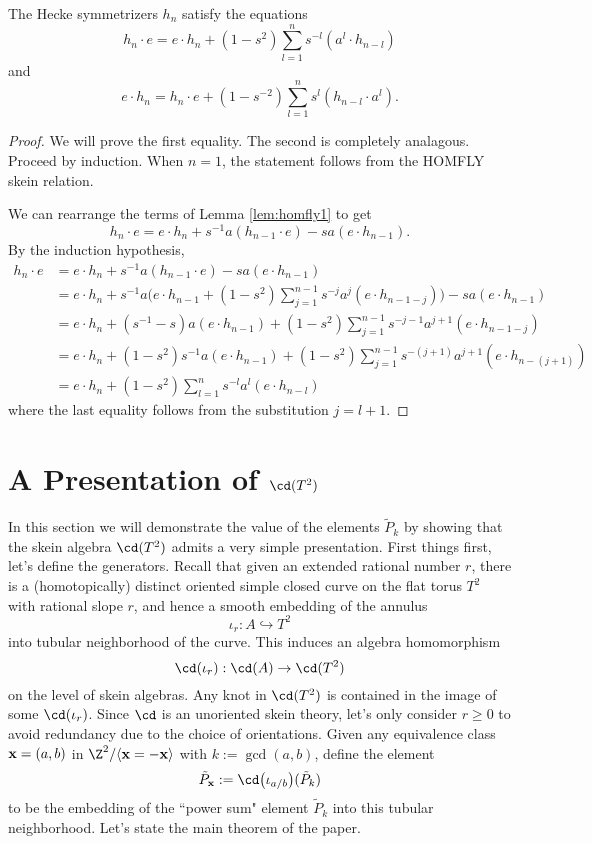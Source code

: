 \begin{theorem} \label{prop:homfly2}
The Hecke symmetrizers $h_n$ satisfy the equations
\[
h_n \cdot e = e \cdot h_n + ( 1 - s^2 ) \sum_{l=1}^{n} s^{-l} ( a^l \cdot h_{n-l} )
\]
and
\[
e \cdot h_n = h_n \cdot e + (1 - s^{-2} ) \sum_{l=1}^{n} s^l ( h_{n-l} \cdot a^l ).
\]
\end{theorem}
\begin{proof}
We will prove the first equality. The second is completely analagous. Proceed by induction. When $n=1$, the statement follows from the HOMFLY skein relation. 

We can rearrange the terms of Lemma \ref{lem:homfly1} to get
\begin{equation} \label{eq:homfly1b}
h_n \cdot e = e \cdot h_n + s^{-1} a ( h_{n-1} \cdot e ) - s a ( e \cdot h_{n-1} ).
\end{equation}
By the induction hypothesis,
\begin{align*}
h_n \cdot e & = e \cdot h_n + s^{-1} a ( h_{n-1} \cdot e ) - s a ( e \cdot h_{n-1} ) \\
& = e \cdot h_n + s^{-1} a \Big( e \cdot h_{n-1} + ( 1 - s^2 ) \sum_{j=1}^{n-1} s^{-j} a^j ( e \cdot h_{n-1-j} ) \Big) - s a ( e \cdot h_{n-1} ) \\
& = e \cdot h_n + ( s^{-1} - s ) a ( e \cdot h_{n-1} ) + ( 1 - s^2 ) \sum_{j=1}^{n-1} s^{-j-1} a^{j+1} ( e \cdot h_{n-1-j} ) \\ 
& = e \cdot h_n + ( 1 - s^2 ) s^{-1} a ( e \cdot h_{n-1} ) + ( 1 - s^2 ) \sum_{j=1}^{n-1} s^{-(j+1)} a^{j+1} ( e \cdot h_{n-(j+1)} ) \\
&= e \cdot h_n + ( 1 - s^2 ) \sum_{l=1}^{n} s^{-l} a^{l} ( e \cdot h_{n-l} )
\end{align*}
where the last equality follows from the substitution $j=l+1$. 
\end{proof}


\section{A Presentation of $\cd(T^2)$}

In this section we will demonstrate the value of the elements $\tilde{P}_k$  by showing that the skein algebra $\cd(T^2)$ admits a very simple presentation. First things first, let's define the generators. Recall that given an extended rational number $r$, there is a (homotopically) distinct oriented simple closed curve on the flat torus $T^2$ with rational slope $r$, and hence a smooth embedding of the annulus 
\[
\iota_r: A \hookrightarrow T^2
\]
into tubular neighborhood of the curve. This induces an algebra homomorphism
\[
\cd(\iota_r): \cd(A) \to \cd(T^2)
\]
on the level of skein algebras. Any knot in $\cd(T^2)$ is contained in the image of some $\cd(\iota_r)$. Since $\cd$ is an unoriented skein theory, let's only consider $r \geq 0$ to avoid redundancy due to the choice of orientations. Given any equivalence class ${\mathbf{x}} = (a, b)$ in $\Z^2 / \langle \xx = - \xx \rangle$ with $k := \gcd(a, b)$, define the element
\[
\tilde{P}_\xx := \cd\big(\iota_{a/b}\big)(\tilde{P}_k)
\]
to be the embedding of the ``power sum" element $\tilde{P}_k$ into this tubular neighborhood. Let's state the main theorem of the paper.

